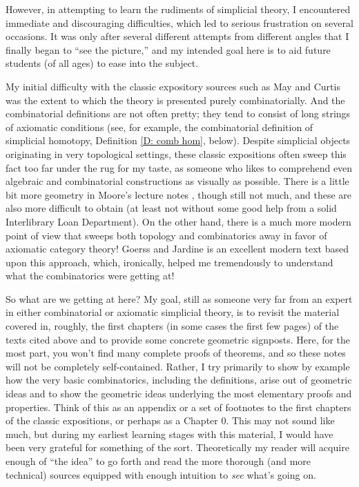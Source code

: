 \documentclass[12pt]{article}
\theoremstyle{plain}
\theoremstyle{definition}
\begin{document}
 However, in attempting to learn the rudiments of simplicial  theory, I encountered immediate and discouraging difficulties, which led to serious frustration on several occasions. It was only after several different attempts from different angles that I finally began to ``see the picture,'' and my intended goal here is to aid future students (of all ages) to ease into the subject.

My initial difficulty with the classic expository sources such as May \cite{MAY67} and Curtis \cite{Cu71} was the extent to which the theory is presented purely combinatorially. And the combinatorial definitions are not often pretty; they tend to consist of long strings of axiomatic conditions (see, for example, the combinatorial definition of simplicial homotopy,   Definition \ref{D: comb hom}, below). Despite simplicial objects originating in very topological settings, these classic expositions often sweep this fact too far under the rug for my taste, as someone who likes to comprehend even algebraic and combinatorial constructions as visually as possible. There is a little bit more geometry in Moore's lecture notes \cite{MOORE}, though still not much, and these are also more difficult to obtain (at least not without some good help from a solid Interlibrary Loan Department). On the other hand, there is a much more modern point of view that sweeps both topology and combinatorics away in favor of axiomatic category theory! Goerss and Jardine \cite{GoeJar} is an excellent modern text based upon this approach, which, ironically, helped me tremendously to understand what the combinatorics were getting at!

So what are we getting at here? My goal, still as someone very far from an expert in either combinatorial or axiomatic simplicial theory, is to revisit the material covered in, roughly, the first chapters (in some cases the first few pages) of the texts cited above and to provide some concrete geometric signposts. Here, for the most part, you won't find many complete proofs of theorems, and so these notes will not be completely self-contained. Rather, I try primarily to show by example how the very basic combinatorics, including the definitions, arise out of geometric ideas and to show the geometric ideas underlying the most elementary proofs and properties. Think of this as an appendix or a set of footnotes  to the first chapters of the classic expositions, or perhaps as a Chapter 0. This may not sound like much, but during my earliest learning stages with this material, I would have been very grateful for something of the sort. Theoretically my reader will acquire  enough of ``the idea'' to go forth and read the more thorough (and more technical) sources equipped with enough intuition to \emph{see} what's going on. 
\end{document}
